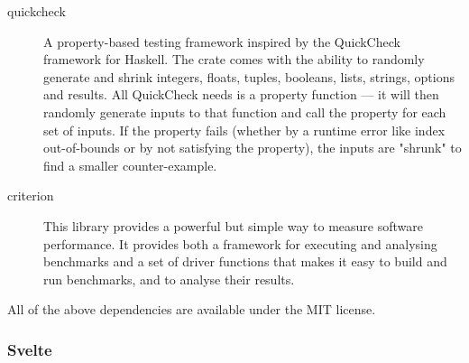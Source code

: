 \documentclass[english,engineering]{wizthesis}
\begin{document}
\begin{description}
  \item[quickcheck] A property-based testing framework inspired by the
  QuickCheck framework for Haskell. The crate comes with the ability to randomly
  generate and shrink integers, floats, tuples, booleans, lists, strings,
  options and results. All QuickCheck needs is a property function --- it will
  then randomly generate inputs to that function and call the property for each
  set of inputs. If the property fails (whether by a runtime error like index
  out-of-bounds or by not satisfying the property), the inputs are "shrunk" to
  find a smaller counter-example.
  \item[criterion] This library provides a powerful but simple way to measure
  software performance. It provides both a framework for executing and analysing
  benchmarks and a set of driver functions that makes it easy to build and run
  benchmarks, and to analyse their results.
\end{description}
All of the above dependencies are available under the MIT license.

\subsubsection*{Svelte}
\end{document}
